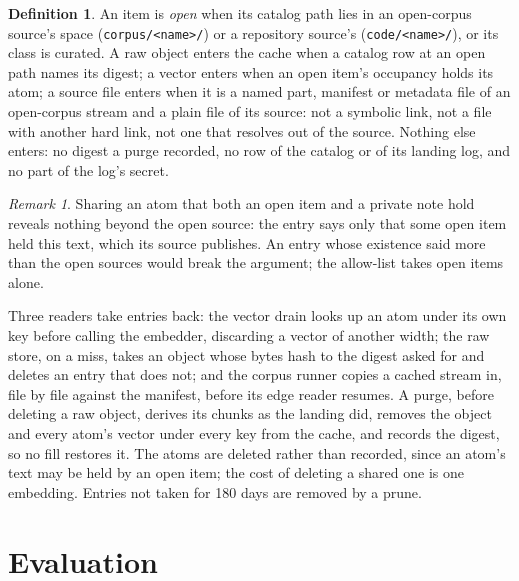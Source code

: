 \documentclass[11pt]{article}
\theoremstyle{plain}
\theoremstyle{definition}
\newtheorem{definition}{Definition}
\theoremstyle{remark}
\newtheorem{remark}{Remark}
\newcommand{\code}[1]{\texttt{#1}}
\begin{document}
\begin{definition}
An item is \emph{open} when its catalog path lies in an open-corpus source's space
(\code{corpus/<name>/}) or a repository source's (\code{code/<name>/}), or its class is curated. A
raw object enters the cache when a catalog row at an open path names its digest; a vector enters
when an open item's occupancy holds its atom; a source file enters when it is a named part, manifest
or metadata file of an open-corpus stream and a plain file of its source: not a symbolic link, not
a file with another hard link, not one that resolves out of the source. Nothing else enters: no
digest a purge recorded, no row of the catalog or of its landing log, and no part of the log's
secret.
\end{definition}

\begin{remark}
Sharing an atom that both an open item and a private note hold reveals nothing beyond the open
source: the entry says only that some open item held this text, which its source publishes. An
entry whose existence said more than the open sources would break the argument; the allow-list
takes open items alone.
\end{remark}

Three readers take entries back: the vector drain looks up an atom under its own key before calling
the embedder, discarding a vector of another width; the raw store, on a miss, takes an object whose
bytes hash to the digest asked for and deletes an entry that does not; and the corpus runner copies
a cached stream in, file by file against the manifest, before its edge reader resumes. A purge,
before deleting a raw object, derives its chunks as the landing did, removes the object and every
atom's vector under every key from the cache, and records the digest, so no fill restores it. The
atoms are deleted rather than recorded, since an atom's text may be held by an open item; the cost
of deleting a shared one is one embedding. Entries not taken for 180 days are removed by a prune.

\section{Evaluation}\label{sec:eval}
\end{document}
